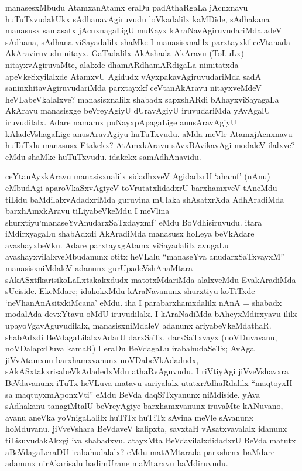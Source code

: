 \begin{artha}
manasesxMbudu AtamxanAtamx eraDu padAthaRgaLa jAcnxnavu huTuTxvudakUkx sAdhanavAgiruvudu loVkadalilx kaMDide, sAdhakana manasusx samasatx jAcnxnagaLigU muKayx kAraNavAgiruvudariMda adeV sAdhana, sAdhana viSayadalilx shaMke I manasisxnalilx parxtayxkf ceVtanada AkAraviruvudu nitayx. GaTadalilx AkAshada AkAravu (ToLuLx) nitayxvAgiruvaMte, alalxde dhamARdhamARdigaLa nimitatxda apeVkeSxyilalxde AtamxvU Agidudx vAyxpakavAgiruvudariMda sadA saninxhitavAgiruvudariMda parxtayxkf ceVtanAkAravu nitayxveMdeV heVLabeVkalalxve? manasisxnalilx shabadx sapxshARdi bAhayxviSayagaLa AkAravu manasisxge beVreyAgiyU dUravAgiyU iruvudariMda yAvAgalU iruvudilalx. Adare namamx puNayxpApagaLige anusAravAgiyU kAladeVshagaLige anusAravAgiyu huTuTxvudu. aMda meVle AtamxjAcnxnavu huTaTxlu manasusx Etakekx? AtAmxkAravu sAvxBAvikavAgi modaleV ilalxve? eMdu shaMke huTuTxvudu. \ndash  idakekx samAdhAnavidu. 

ceYtanAyxkAravu manasisxnalilx sidadhxveV AgidadxrU `ahamf' (nAnu) eMbudAgi aparoVkaSxvAgiyeV toVrutatxlidadxrU barxhamxveV tAneMdu tiLidu baMdilalxvAdadxriMda guruvina mUlaka shAsatxrXda AdhAradiMda barxhAmxkAravu tiLiyabeVkeMdu I meVlina shurxtiyu\break `manaseYvAnudarxSaTxdayxmf' eMdu BoVdhisiruvudu. itara iMdirxyagaLu shabAdxdi AkAradiMda manasusx hoLeya beVkAdare avashayxbeVku. Adare parxtayxgAtamx viSayadalilx avugaLu avashayxvilalxveMbudanunx otitx heVLalu ``manaseYva anudarxSaTxvayxM'' manasisxniMdaleV adanunx gurUpadeVshAnaMtara sAkASxtfkarisikoLaLxtakakxdudx matotxMdariMda alalxveMdu EvakAradiMda sUciside. EkeMdare; idakokxMdu kAraNavanunx shurxtiyu koTiTxde `neVhanAnAsitxkiMcana' eMdu. iha I parabarxhamxdalilx nAnA = shabadx modalAda devxYtavu oMdU iruvudilalx. I kAraNadiMda bAheyxMdirxyavu ililx upayoVgavAguvudilalx, manasisxniMdaleV adanunx ariyabeVkeMdathaR. shabAdxdi BeVdagaLilalxvAdarU darxSaTx. darxSaTxvayx (noVDuvavanu, noVDalapxDuva kamaR) I eraDu BeVdagaLu irabahudaSeTx; AvAga jiVvAtamxnu barxhamxvanunx noVDabeVkAdadudx, sAkASxtakxrisabeVkAdadedxMdu athaRvAguvudu. I riVtiyAgi jiVveVshavxra BeVdavanunx iTuTx heVLuva matavu sariyalalx \ndash  utatxrAdhaRdalilx ``maqtoyxH sa maqtuyxmAponxVti'' eMdu BeVda daqSiTxyanunx niMdiside. yAva sAdhakanu tanagiMtalU beVreyAgiye barxhamxvanunx iruvaMte kANuvano, avanu aneVka yoVnigaLalilx huTiTx huTiTx sAvina meVle sAvanunx hoMduvanu. jiVveVshara BeVdaveV kalipxta, savxtaH vAsatxvavalalx idanunx tiLisuvudakAkxgi iva shabadxvu. atayxMta BeVdavilalxdidadxrU BeVda matutx aBeVdagaLeraDU irabahudalalx? eMdu matAMtarada parxshenx baMdare adanunx nirAkarisalu hadimUrane maMtarxvu baMdiruvudu.
\end{artha}

